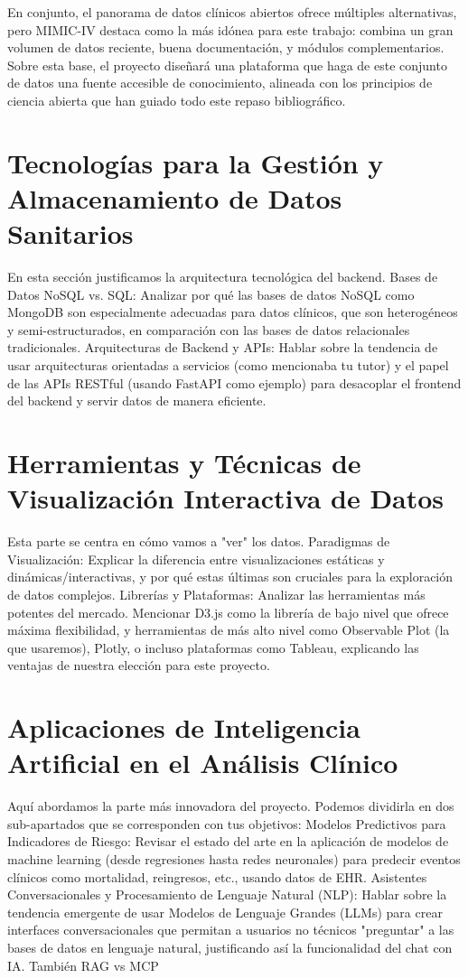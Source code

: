\newpage
En conjunto, el panorama de datos clínicos abiertos ofrece múltiples alternativas, pero MIMIC-IV destaca como la más idónea para este trabajo: combina un gran volumen de datos reciente, buena documentación, y módulos complementarios. Sobre esta base, el proyecto diseñará una plataforma que haga de este conjunto de datos una fuente accesible de conocimiento, alineada con los principios de ciencia abierta que han guiado todo este repaso bibliográfico.


\section{Tecnologías para la Gestión y Almacenamiento de Datos Sanitarios}

En esta sección justificamos la arquitectura tecnológica del backend.
Bases de Datos NoSQL vs. SQL: Analizar por qué las bases de datos NoSQL como MongoDB son especialmente adecuadas para datos clínicos, que son heterogéneos y semi-estructurados, en comparación con las bases de datos relacionales tradicionales.
Arquitecturas de Backend y APIs: Hablar sobre la tendencia de usar arquitecturas orientadas a servicios (como mencionaba tu tutor) y el papel de las APIs RESTful (usando FastAPI como ejemplo) para desacoplar el frontend del backend y servir datos de manera eficiente.

\section{Herramientas y Técnicas de Visualización Interactiva de Datos}

Esta parte se centra en cómo vamos a "ver" los datos.
Paradigmas de Visualización: Explicar la diferencia entre visualizaciones estáticas y dinámicas/interactivas, y por qué estas últimas son cruciales para la exploración de datos complejos.
Librerías y Plataformas: Analizar las herramientas más potentes del mercado. Mencionar D3.js como la librería de bajo nivel que ofrece máxima flexibilidad, y herramientas de más alto nivel como Observable Plot (la que usaremos), Plotly, o incluso plataformas como Tableau, explicando las ventajas de nuestra elección para este proyecto.

\section{Aplicaciones de Inteligencia Artificial en el Análisis Clínico}

Aquí abordamos la parte más innovadora del proyecto. Podemos dividirla en dos sub-apartados que se corresponden con tus objetivos:
Modelos Predictivos para Indicadores de Riesgo: Revisar el estado del arte en la aplicación de modelos de machine learning (desde regresiones hasta redes neuronales) para predecir eventos clínicos como mortalidad, reingresos, etc., usando datos de EHR.
Asistentes Conversacionales y Procesamiento de Lenguaje Natural (NLP): Hablar sobre la tendencia emergente de usar Modelos de Lenguaje Grandes (LLMs) para crear interfaces conversacionales que permitan a usuarios no técnicos "preguntar" a las bases de datos en lenguaje natural, justificando así la funcionalidad del chat con IA.
También RAG vs MCP